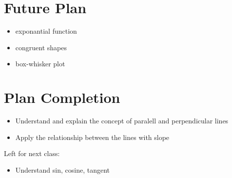 \documentclass[12pt]{article}
\begin{document}
\section{Future Plan}
\begin{itemize}
    \item exponantial function
    \item congruent shapes
    \item box-whisker plot

\end{itemize}
\section{Plan Completion}
\begin{itemize}
    \item Understand and explain the concept of paralell and perpendicular lines
    \item Apply the relationship between the lines with slope
\end{itemize}
Left for next class: 
\begin{itemize}
    \item Understand sin, cosine, tangent
\end{itemize}
\end{document}
